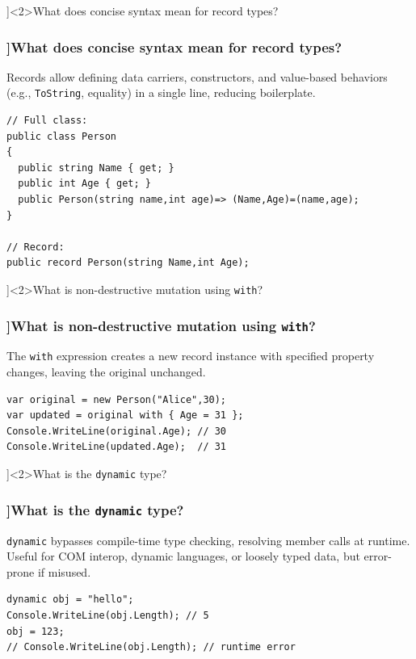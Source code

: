 \QuestionSlide[\CategoryBadge[LangColor!20]{Language Feature}]<2>{What does concise syntax mean for record types?}
\begin{frame}[fragile]
  \frametitle{\AnswerTitle[\CategoryBadge[LangColor!20]{Language Feature}]{What does concise syntax mean for record types?}}

  {\footnotesize
    Records allow defining data carriers, constructors, and value-based behaviors (e.g., \texttt{ToString}, equality) in a single line, reducing boilerplate.
  }

  \begin{verbatim}
// Full class:
public class Person
{
  public string Name { get; }
  public int Age { get; }
  public Person(string name,int age)=> (Name,Age)=(name,age);
}

// Record:
public record Person(string Name,int Age);
  \end{verbatim}
\end{frame}

\QuestionSlide[\CategoryBadge[LangColor!20]{Language Feature}]<2>{What is non-destructive mutation using \texttt{with}?}
\begin{frame}[fragile]
  \frametitle{\AnswerTitle[\CategoryBadge[LangColor!20]{Language Feature}]{What is non-destructive mutation using \texttt{with}?}}

  {\footnotesize
    The \texttt{with} expression creates a new record instance with specified property changes, leaving the original unchanged.
  }

  \begin{verbatim}
var original = new Person("Alice",30);
var updated = original with { Age = 31 };
Console.WriteLine(original.Age); // 30
Console.WriteLine(updated.Age);  // 31
  \end{verbatim}
\end{frame}

\QuestionSlide[\CategoryBadge[LangColor!20]{Language Feature}]<2>{What is the \texttt{dynamic} type?}
\begin{frame}[fragile]
  \frametitle{\AnswerTitle[\CategoryBadge[LangColor!20]{Language Feature}]{What is the \texttt{dynamic} type?}}

  {\footnotesize
    \texttt{dynamic} bypasses compile-time type checking, resolving member calls at runtime. Useful for COM interop, dynamic languages, or loosely typed data, but error-prone if misused.
  }

  \begin{verbatim}
dynamic obj = "hello";
Console.WriteLine(obj.Length); // 5
obj = 123;
// Console.WriteLine(obj.Length); // runtime error
  \end{verbatim}
\end{frame}

